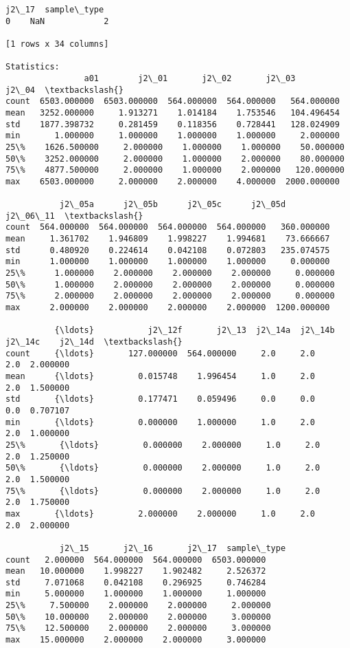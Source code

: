 \documentclass[11pt]{article}
\begin{document}
\begin{Verbatim}[commandchars=\\\{\}]
   j2\_17  sample\_type  
0    NaN            2  

[1 rows x 34 columns]

Statistics: 
                a01        j2\_01       j2\_02       j2\_03        j2\_04  \textbackslash{}
count  6503.000000  6503.000000  564.000000  564.000000   564.000000   
mean   3252.000000     1.913271    1.014184    1.753546   104.496454   
std    1877.398732     0.281459    0.118356    0.728441   128.024909   
min       1.000000     1.000000    1.000000    1.000000     2.000000   
25\%    1626.500000     2.000000    1.000000    1.000000    50.000000   
50\%    3252.000000     2.000000    1.000000    2.000000    80.000000   
75\%    4877.500000     2.000000    1.000000    2.000000   120.000000   
max    6503.000000     2.000000    2.000000    4.000000  2000.000000   

           j2\_05a      j2\_05b      j2\_05c      j2\_05d     j2\_06\_11  \textbackslash{}
count  564.000000  564.000000  564.000000  564.000000   360.000000   
mean     1.361702    1.946809    1.998227    1.994681    73.666667   
std      0.480920    0.224614    0.042108    0.072803   235.074575   
min      1.000000    1.000000    1.000000    1.000000     0.000000   
25\%      1.000000    2.000000    2.000000    2.000000     0.000000   
50\%      1.000000    2.000000    2.000000    2.000000     0.000000   
75\%      2.000000    2.000000    2.000000    2.000000     0.000000   
max      2.000000    2.000000    2.000000    2.000000  1200.000000   

          {\ldots}           j2\_12f       j2\_13  j2\_14a  j2\_14b  j2\_14c    j2\_14d  \textbackslash{}
count     {\ldots}       127.000000  564.000000     2.0     2.0     2.0  2.000000   
mean      {\ldots}         0.015748    1.996454     1.0     2.0     2.0  1.500000   
std       {\ldots}         0.177471    0.059496     0.0     0.0     0.0  0.707107   
min       {\ldots}         0.000000    1.000000     1.0     2.0     2.0  1.000000   
25\%       {\ldots}         0.000000    2.000000     1.0     2.0     2.0  1.250000   
50\%       {\ldots}         0.000000    2.000000     1.0     2.0     2.0  1.500000   
75\%       {\ldots}         0.000000    2.000000     1.0     2.0     2.0  1.750000   
max       {\ldots}         2.000000    2.000000     1.0     2.0     2.0  2.000000   

           j2\_15       j2\_16       j2\_17  sample\_type  
count   2.000000  564.000000  564.000000  6503.000000  
mean   10.000000    1.998227    1.902482     2.526372  
std     7.071068    0.042108    0.296925     0.746284  
min     5.000000    1.000000    1.000000     1.000000  
25\%     7.500000    2.000000    2.000000     2.000000  
50\%    10.000000    2.000000    2.000000     3.000000  
75\%    12.500000    2.000000    2.000000     3.000000  
max    15.000000    2.000000    2.000000     3.000000  


\end{Verbatim}
\end{document}

